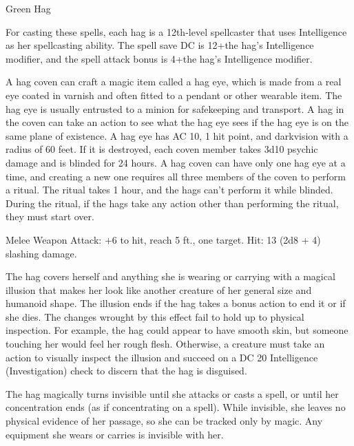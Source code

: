 \begin{monsterbox}{Green Hag}
\begin{monsteraction}
For casting these spells, each hag is a 12th-level spellcaster that uses Intelligence as her spellcasting ability. The spell save DC is 12+the hag's Intelligence modifier, and the spell attack bonus is 4+the hag's Intelligence modifier.
\end{monsteraction}
\begin{monsteraction}
A hag coven can craft a magic item called a hag eye, which is made from a real eye coated in varnish and often fitted to a pendant or other wearable item. The hag eye is usually entrusted to a minion for safekeeping and transport. A hag in the coven can take an action to see what the hag eye sees if the hag eye is on the same plane of existence. A hag eye has AC 10, 1 hit point, and darkvision with a radius of 60 feet. If it is destroyed, each coven member takes 3d10 psychic damage and is blinded for 24 hours.
A hag coven can have only one hag eye at a time, and creating a new one requires all three members of the coven to perform a ritual. The ritual takes 1 hour, and the hags can't perform it while blinded. During the ritual, if the hags take any action other than performing the ritual, they must start over.
\end{monsteraction}
\begin{monsteraction}[Claws]
Melee Weapon Attack: +6 to hit, reach 5 ft., one target. Hit: 13 (2d8 + 4) slashing damage.
\end{monsteraction}
\begin{monsteraction}
The hag covers herself and anything she is wearing or carrying with a magical illusion that makes her look like another creature of her general size and humanoid shape. The illusion ends if the hag takes a bonus action to end it or if she dies.
The changes wrought by this effect fail to hold up to physical inspection. For example, the hag could appear to have smooth skin, but someone touching her would feel her rough flesh. Otherwise, a creature must take an action to visually inspect the illusion and succeed on a DC 20 Intelligence (Investigation) check to discern that the hag is disguised.
\end{monsteraction}
\begin{monsteraction}
The hag magically turns invisible until she attacks or casts a spell, or until her concentration ends (as if concentrating on a spell). While invisible, she leaves no physical evidence of her passage, so she can be tracked only by magic. Any equipment she wears or carries is invisible with her.
\end{monsteraction}
\end{monsterbox}